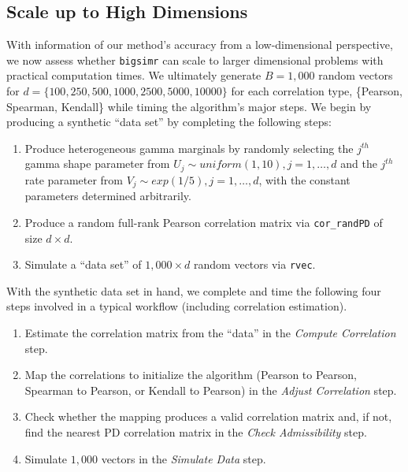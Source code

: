 \documentclass{article}
\begin{document}
\hypertarget{scale-up-to-high-dimensions}{%
\subsection{Scale up to High
Dimensions}\label{scale-up-to-high-dimensions}}

With information of our method's accuracy from a low-dimensional
perspective, we now assess whether \texttt{bigsimr} can scale to larger
dimensional problems with practical computation times. We ultimately
generate \(B=1,000\) random vectors for
\(d=\{100, 250, 500, 1000, 2500, 5000, 10000\}\) for each correlation
type, \{Pearson, Spearman, Kendall\} while timing the algorithm's major
steps. We begin by producing a synthetic ``data set'' by completing the
following steps:

\begin{enumerate}
\def\labelenumi{\arabic{enumi}.}
\tightlist
\item
  Produce heterogeneous gamma marginals by randomly selecting the
  \(j^{th}\) gamma shape parameter from
  \(U_j \sim uniform(1,10), j=1,\ldots,d\) and the \(j^{th}\) rate
  parameter from \(V_j \sim exp(1/5), j=1,\ldots,d\), with the constant
  parameters determined arbitrarily.
\item
  Produce a random full-rank Pearson correlation matrix via
  \texttt{cor\_randPD} of size \(d \times d\).
\item
  Simulate a ``data set'' of \(1,000 \times d\) random vectors via
  \texttt{rvec}.
\end{enumerate}

With the synthetic data set in hand, we complete and time the following
four steps involved in a typical workflow (including correlation
estimation).

\begin{enumerate}
\def\labelenumi{\arabic{enumi}.}
\tightlist
\item
  Estimate the correlation matrix from the ``data'' in the \emph{Compute
  Correlation} step.
\item
  Map the correlations to initialize the algorithm (Pearson to Pearson,
  Spearman to Pearson, or Kendall to Pearson) in the \emph{Adjust
  Correlation} step.
\item
  Check whether the mapping produces a valid correlation matrix and, if
  not, find the nearest PD correlation matrix in the \emph{Check
  Admissibility} step.
\item
  Simulate \(1,000\) vectors in the \emph{Simulate Data} step.
\end{enumerate}
\end{document}
